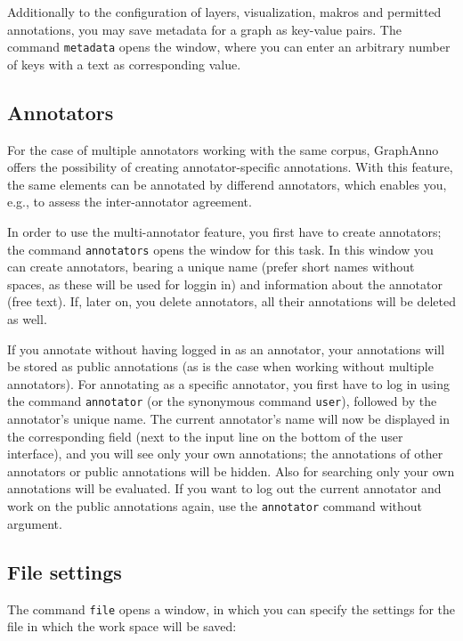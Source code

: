 \documentclass[12pt]{scrartcl}
\begin{document}
Additionally to the configuration of layers, visualization, makros and permitted annotations, you may save metadata for a graph as key-value pairs.
The command \texttt{metadata} opens the window, where you can enter an arbitrary number of keys with a text as corresponding value.

\subsection{Annotators}\label{annotatoren}

For the case of multiple annotators working with the same corpus, GraphAnno offers the possibility of creating annotator-specific annotations.
With this feature, the same elements can be annotated by differend annotators, which enables you, e.g., to assess the inter-annotator agreement.

In order to use the multi-annotator feature, you first have to create annotators; the command \texttt{annotators} opens the window for this task.
In this window you can create annotators, bearing a unique name (prefer short names without spaces, as these will be used for loggin in) and information about the annotator (free text).
If, later on, you delete annotators, all their annotations will be deleted as well.

If you annotate without having logged in as an annotator, your annotations will be stored as public annotations (as is the case when working without multiple annotators).
For annotating as a specific annotator, you first have to log in using the command \texttt{annotator} (or the synonymous command \texttt{user}), followed by the annotator’s unique name.
The current annotator’s name will now be displayed in the corresponding field (next to the input line on the bottom of the user interface), and you will see only your own annotations; the annotations of other annotators or public annotations will be hidden.
Also for searching only your own annotations will be evaluated.
If you want to log out the current annotator and work on the public annotations again, use the \texttt{annotator} command without argument.

\subsection{File settings}

The command \texttt{file} opens a window, in which you can specify the settings for the file in which the work space will be saved:
\end{document}
